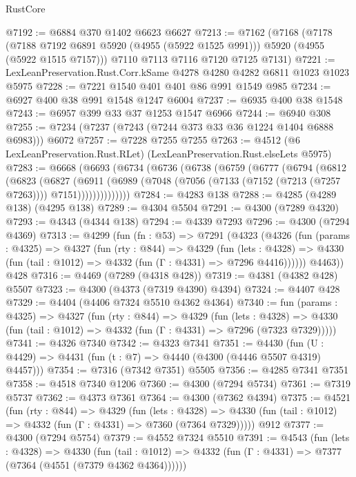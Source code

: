\begin{lexlean}{RustCore}
\begin{coremodule}
@7192 := @6884 @370 @1402 @6623 @6627
@7213 := @7162
    (@7168
      (@7178 (@7188 @7192 @6891 @5920 (@4955 (@5922 @1525 @991))) @5920 (@4955 (@5922 @1515 @7157)))
      @7110
      @7113
      @7116
      @7120
      @7125
      @7131)
@7221 := LexLeanPreservation.Rust.Corr.kSame @4278 @4280 @4282 @6811 @1023 @1023 @5975
@7228 := @7221 @1540 @401 @401 @86 @991 @1549 @985
@7234 := @6927 @400 @38 @991 @1548 @1247 @6004
@7237 := @6935 @400 @38 @1548
@7243 := @6957 @399 @33 @37 @1253 @1547 @6966
@7244 := @6940 @308
@7255 := @7234 (@7237 (@7243 (@7244 @373 @33 @36 @1224 @1404 @6888 @6983))) @6072
@7257 := @7228 @7255 @7255
@7263 := @4512 (@6 LexLeanPreservation.Rust.RLet) (LexLeanPreservation.Rust.elseLets @5975)
@7283 := @6668
    (@6693
      (@6734
        (@6736
          (@6738
            (@6759
              (@6777
                (@6794
                  (@6812
                    (@6823
                      (@6827
                        (@6911
                          (@6989
                            (@7048 (@7056 (@7133 (@7152 (@7213 (@7257 @7263)))) @7151))))))))))))))
@7284 := @4283 @138
@7288 := @4285 (@4289 @138) (@4295 @138)
@7289 := @4304 @5504
@7291 := @4300 (@7289 @4320)
@7293 := @4343 (@4344 @138)
@7294 := @4339 @7293
@7296 := @4300 (@7294 @4369)
@7313 := @4299
    (fun (fn : @53) =>
    @7291
      (@4323
        (@4326
          (fun (params : @4325) =>
          @4327
            (fun (rty : @844) =>
            @4329
              (fun (lets : @4328) =>
              @4330 (fun (tail : @1012) => @4332 (fun (Γ : @4331) => @7296 @4416))))))
        @4463))
    @428
@7316 := @4469 (@7289 (@4318 @428))
@7319 := @4381 (@4382 @428) @5507
@7323 := @4300 (@4373 (@7319 @4390) @4394)
@7324 := @4407 @428
@7329 := @4404 (@4406 @7324 @5510 @4362 @4364)
@7340 := fun (params : @4325) =>
  @4327
    (fun (rty : @844) =>
    @4329
      (fun (lets : @4328) =>
      @4330 (fun (tail : @1012) => @4332 (fun (Γ : @4331) => @7296 (@7323 @7329)))))
@7341 := @4326 @7340
@7342 := @4323 @7341
@7351 := @4430 (fun (U : @4429) => @4431 (fun (t : @7) => @4440 (@4300 (@4446 @5507 @4319) @4457)))
@7354 := @7316 (@7342 @7351) @5505
@7356 := @4285 @7341 @7351
@7358 := @4518 @7340 @1206
@7360 := @4300 (@7294 @5734)
@7361 := @7319 @5737
@7362 := @4373 @7361
@7364 := @4300 (@7362 @4394)
@7375 := @4521
    (fun (rty : @844) =>
    @4329
      (fun (lets : @4328) =>
      @4330 (fun (tail : @1012) => @4332 (fun (Γ : @4331) => @7360 (@7364 @7329)))))
    @912
@7377 := @4300 (@7294 @5754)
@7379 := @4552 @7324 @5510
@7391 := @4543
    (fun (lets : @4328) =>
    @4330
      (fun (tail : @1012) => @4332 (fun (Γ : @4331) => @7377 (@7364 (@4551 (@7379 @4362 @4364))))))

\end{coremodule}
\end{lexlean}
